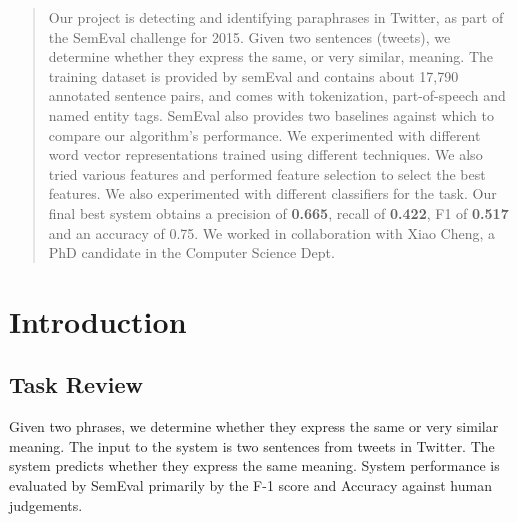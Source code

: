 \documentclass[conference]{IEEEtran}
\begin{document}



%
\IEEEpeerreviewmaketitle


\begin{abstract}
Our project is detecting and identifying paraphrases in Twitter, as part of the SemEval challenge for 2015.   Given two sentences (tweets), we determine whether they express the same, or very similar, meaning.  The training dataset is provided by semEval and contains about 17,790 annotated sentence pairs, and comes with tokenization, part-of-speech and named entity tags. SemEval also provides two baselines against which to compare our algorithm's performance. We experimented with different word vector representations trained using different techniques. We also tried various features and performed feature selection to select the best features. We also experimented with different classifiers for the task. Our final best system obtains a precision of \textbf{0.665}, recall of \textbf{0.422}, F1 of \textbf{0.517} and an accuracy of 0.75. We worked in collaboration with  Xiao Cheng, a PhD candidate in the Computer Science Dept.\\ 
\end{abstract}

\section{Introduction}
\subsection{Task Review}
\noindent Given two phrases, we determine whether they express the same or very similar meaning. The input to the system is two sentences from tweets in Twitter. The system predicts whether they express the same meaning.  System performance is evaluated by SemEval primarily by the F-1 score and Accuracy against human judgements.\\
\end{document}
